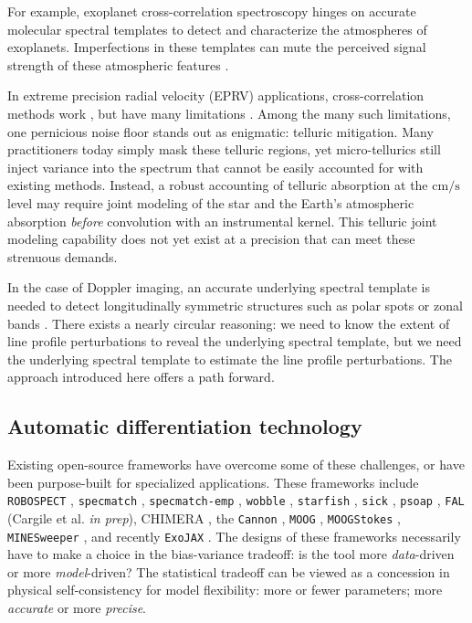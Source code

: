 \documentclass[twocolumn]{aastex631}
\begin{document}
For example, exoplanet cross-correlation spectroscopy \citep{2013MNRAS.436L..35B} hinges on accurate molecular spectral templates to detect and characterize the atmospheres of exoplanets.  Imperfections in these templates can mute the perceived signal strength of these atmospheric features \citep{2015A&A...575A..20H}.

In extreme precision radial velocity (EPRV) applications, cross-correlation methods work \citep{2018A_A...620A..47D}, but have many limitations \citep{2022arXiv220110639Z}.  Among the many such limitations, one pernicious noise floor stands out as enigmatic: telluric mitigation.  Many practitioners today simply mask these telluric regions, yet micro-tellurics still inject variance into the spectrum that cannot be easily accounted for with existing methods.  Instead, a robust accounting of telluric absorption at the $\mathrm{cm/s}$ level may require joint modeling of the star and the Earth's atmospheric absorption \emph{before} convolution with an instrumental kernel.  This telluric joint modeling capability does not yet exist at a precision that can meet these strenuous demands.

In the case of Doppler imaging, an accurate underlying spectral template is needed to detect longitudinally symmetric structures \citep{1983PASP...95..565V,2021arXiv211006271L} such as polar spots \citep{roettenbacher16} or zonal bands \citep{Crossfield14,2021ApJ...906...64A}.  There exists a nearly circular reasoning: we need to know the extent of line profile perturbations to reveal the underlying spectral template, but we need the underlying spectral template to estimate the line profile perturbations.  The approach introduced here offers a path forward.

\subsection{Automatic differentiation technology}

Existing open-source frameworks have overcome some of these challenges, or have been purpose-built for specialized applications.
These frameworks include \texttt{ROBOSPECT} \citep{2013PASP..125.1164W}, \texttt{specmatch} \citep{2015PhDT........82P}, \texttt{specmatch-emp} \citep{2017ApJ...836...77Y}, \texttt{wobble} \citep{2019AJ....158..164B}, \texttt{starfish} \citep{czekala15}, \texttt{sick} \citep{2016ApJS..223....8C}, \texttt{psoap} \citep{2017ApJ...840...49C}, \texttt{FAL} (Cargile et al. \emph{in prep}), CHIMERA \citep{2015ApJ...807..183L}, the \texttt{Cannon} \citep{2017ApJ...836....5H},  \texttt{MOOG} \citep{2012ascl.soft02009S}, \texttt{MOOGStokes} \citep{2013AJ....146...51D}, \texttt{MINESweeper} \citep{2020ApJ...900...28C}, and recently \texttt{ExoJAX} \citep{2022ApJS..258...31K}.
The designs of these frameworks necessarily have to make a choice in the bias-variance tradeoff: is the tool more \emph{data}-driven or more \emph{model}-driven?  The statistical tradeoff can be viewed as a concession in physical self-consistency for model flexibility: more or fewer parameters; more \emph{accurate} or more \emph{precise}.
\end{document}
